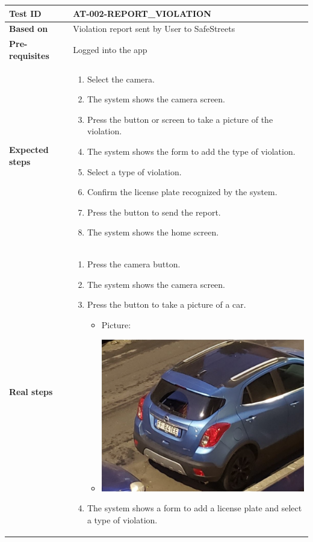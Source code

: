 \begin{table}[H]
    \centering
    \begin{tabular}{p{3cm}p{10cm}}
    \textbf{Test ID} & AT-002-REPORT\_VIOLATION \\ \hline
    \textbf{Based on} & Violation report sent by User to SafeStreets \\ \hline
    \textbf{Pre-requisites} & Logged into the app \\ \hline
    \textbf{Expected steps} & 
        \begin{enumerate} \itemsep0em
            \item Select the camera.
            \item The system shows the camera screen.
            \item Press the button or screen to take a picture of the violation.
            \item The system shows the form to add the type of violation.
            \item Select a type of violation.
            \item Confirm the license plate recognized by the system.
            \item Press the button to send the report.
            \item The system shows the home screen.
        \end{enumerate} \\ \hline
    \textbf{Real steps} & 
        \begin{enumerate} \itemsep0em
            \item Press the camera button.
            \item The system shows the camera screen.
            \item Press the button to take a picture of a car.
            \begin{itemize}[label={}] \itemsep0em
                \item Picture:
                \item \includegraphics[width=.3\textwidth]{Images/test-photo.png}
            \end{itemize}
            \item The system shows a form to add a license plate and select a type of violation.

\end{enumerate}
\end{tabular}
\end{table}
